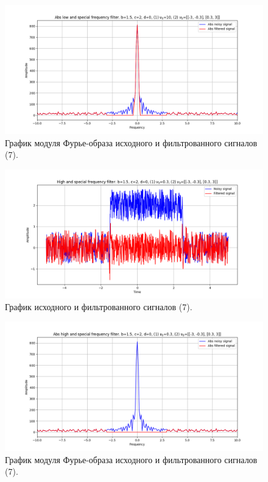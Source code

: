 \documentclass[a4paper, 12pt]{article}
\begin{document}
    \begin{figure}[H]
        \centering
        \includegraphics[scale=0.48]{7_3_abs_u_U_nospec.png}
        \captionsetup{skip=0pt}
        \caption{График модуля Фурье-образа исходного и фильтрованного сигналов (7).}
        \label{fig:f939}
    \end{figure}
    \begin{figure}[!htb]
        \centering
        \includegraphics[scale=0.48]{7_4_u_flt_u_nospec.png}
        \captionsetup{skip=0pt}
        \caption{График исходного и фильтрованного сигналов (7).}
        \label{fig:fiji4f}
    \end{figure}
    \begin{figure}[!htb]
        \centering
        \includegraphics[scale=0.48]{7_4_abs_u_U_nospec.png}
        \captionsetup{skip=0pt}
        \caption{График модуля Фурье-образа исходного и фильтрованного сигналов (7).}
        \label{fig:skfjsjklfq}
    \end{figure}
\end{document}
